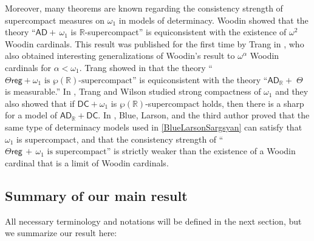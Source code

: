 \documentclass{amsart}
\newcommand{\power}{\wp}
\begin{document}
Moreover, many theorems are known regarding the consistency strength of supercompact measures on $\omega_1$ in models of determinacy.
Woodin showed that the theory ``$\mathsf{AD} + \, \omega_1$ is $\mathbb{R}$-supercompact'' is equiconsistent with the existence of $\omega^2$ Woodin cardinals. This result was published for the first time by Trang in \cite{Tr13, Tr15}, who also obtained interesting generalizations of Woodin's result to $\omega^\alpha$ Woodin cardinals for $\alpha < \omega_1$.
Trang showed in \cite{Tr13,Tr15MALQ,EquiSpctMeas} that the theory ``$\Theta\mathsf{reg} + \omega_1 \text{ is } \power(\mathbb{R})\text{-supercompact}$'' is equiconsistent with the theory ``$\mathsf{AD}_{\mathbb{R}} + \; \Theta$ is measurable.''
In \cite{TrWi21}, Trang and Wilson studied strong compactness of $\omega_1$ and they also showed that if $\mathsf{DC}+\omega_1$ is $\power(\mathbb{R})$-supercompact holds, then there is a sharp for a model of $\mathsf{AD}_{\mathbb{R}} + \mathsf{DC}$.
In \cite{Nairian}, Blue, Larson, and the third author proved that the same type of determinacy models used in \cref{BlueLarsonSargsyan} can satisfy that $\omega_1$ is supercompact, and that the consistency strength of ``$\Theta\mathsf{reg}\, + \, \omega_1 \text{ is supercompact}$'' is strictly weaker than the existence of a Woodin cardinal that is a limit of Woodin cardinals.

\subsection{Summary of our main result}

All necessary terminology and notations will be defined in the next section, but we summarize our result here:
\end{document}
